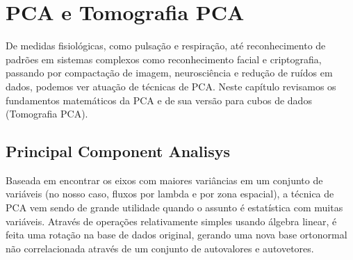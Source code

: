 


\chapter{PCA e Tomografia PCA}
\label{sec:PCAeTomoPCA}

De medidas fisiológicas, como pulsação e respiração, até reconhecimento de padrões em sistemas complexos como
reconhecimento facial e criptografia, passando por compactação de imagem, neurosciência e redução de ruídos em dados,
podemos ver atuação de técnicas de PCA. Neste capítulo revisamos os fundamentos matemáticos da PCA e de sua versão para
cubos de dados (Tomografia PCA).


\section{Principal Component Analisys}
\label{sec:PCAeTomoPCA:PCA}

Baseada em encontrar os eixos com maiores variâncias em um conjunto de variáveis (no nosso caso, fluxos por lambda e por
zona espacial), a técnica de PCA vem sendo de grande utilidade quando o assunto é estatística com muitas variáveis.
Através de operações relativamente simples usando álgebra linear, é feita uma rotação na base de dados original, gerando
uma nova base ortonormal não correlacionada através de um conjunto de autovalores e autovetores.

